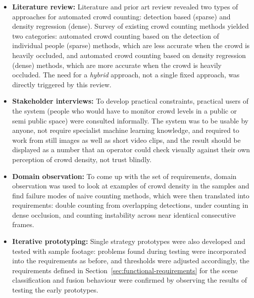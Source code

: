 \begin{itemize}

    \item \textbf{Literature review:} Literature and prior art review revealed two types of approaches for automated crowd counting: detection based (sparse) and density regression (dense). Survey of existing crowd counting methods yielded two categories: automated crowd counting based on the detection of individual people (sparse) methods, which are less accurate when the crowd is heavily occluded, and automated crowd counting based on density regression (dense) methods, which are more accurate when the crowd is heavily occluded. The need for a \emph{hybrid} approach, not a single fixed approach, was directly triggered by this review.

    \item \textbf{Stakeholder interviews:} To develop practical constraints, practical users of the system (people who would have to monitor crowd levels in a public or semi public space) were consulted informally. The system was to be usable by anyone, not require specialist machine learning knowledge, and required to work from still images as well as short video clips, and the result should be displayed as a number that an operator could check visually against their own perception of crowd density, not trust blindly.

    \item \textbf{Domain observation:} To come up with the set of requirements, domain observation was used to look at examples of crowd density in the samples and find failure modes of naive counting methods, which were then translated into requirements: double counting from overlapping detections, under counting in dense occlusion, and counting instability across near identical consecutive frames.

    \item \textbf{Iterative prototyping:} Single strategy prototypes were also developed and tested with sample footage: problems found during testing were incorporated into the requirements as before, and thresholds were adjusted accordingly, the requirements defined in Section~\cref{sec:functional-requirements} for the scene classification and fusion behaviour were confirmed by observing the results of testing the early prototypes. 
    

\end{itemize}


